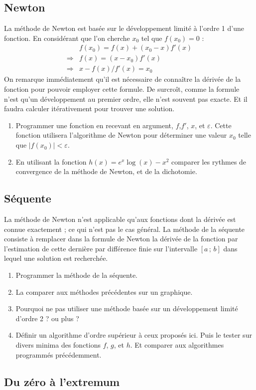 \subsection{Newton}
La méthode de Newton est basée sur le développement limité à l'ordre 1 
d'une fonction. En considérant que l'on cherche $x_0$ tel que $f(x_0) = 0$ :
\begin{align}
& f(x_0) = f(x) + (x_0-x) f'(x) \\
\Rightarrow & f(x) = (x-x_0)f'(x) \\
\Rightarrow & x-f(x)/f'(x) = x_0
\end{align}
On remarque immédiatement qu'il est nécessaire de connaître la dérivée 
de la fonction pour pouvoir employer cette formule. De surcroît,
comme la formule n'est qu'un développement au premier ordre, elle n'est souvent pas
exacte. Et il faudra calculer itérativement pour trouver une solution. 
\begin{enumerate}
\item Programmer une fonction en recevant en argument, $f$,$f'$, $x$, et $\varepsilon$. Cette fonction utilisera l'algorithme de Newton pour 
déterminer une valeur $x_0$ telle que $|f(x_0)| < \varepsilon$.
\item En utilisant la fonction $h(x) = e^x\log(x)-x^2$ comparer les rythmes de convergence de la méthode de Newton, et de la dichotomie. 
\end{enumerate}


\subsection{Séquente}
La méthode de Newton n'est applicable qu'aux fonctions dont la dérivée 
est connue exactement ; ce qui n'est pas le cas général. 
La méthode de la séquente consiste à remplacer dans la formule de Newton 
la dérivée de la fonction par l'estimation de cette dernière par différence finie
sur l'intervalle $[a\,;\,b]$ dans lequel une solution est recherchée. 
\begin{enumerate}
\item Programmer la méthode de la séquente.
\item La comparer aux méthodes précédentes sur un graphique.
\item Pourquoi ne pas utiliser une méthode basée sur un développement 
limité d'ordre 2 ? ou plus ? 
\item Définir un algorithme d'ordre supérieur à ceux proposés ici. 
Puis le tester sur divers minima des fonctions $f$, $g$, et $h$. Et comparer 
aux algorithmes programmés précédemment. 
\end{enumerate}

\subsection{Du zéro à l'extremum}
